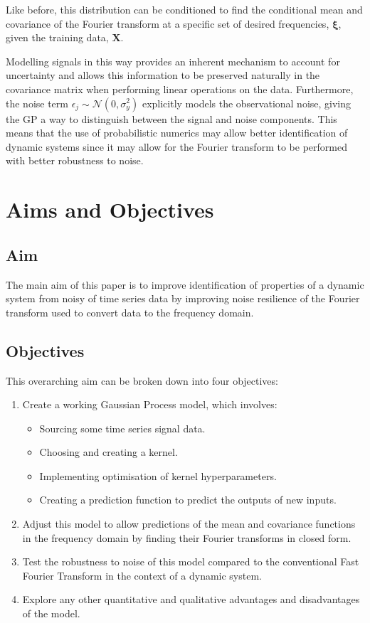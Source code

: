 \documentclass[12pt]{article}
\begin{document}
    Like before, this distribution can be conditioned to find the conditional mean and covariance of the Fourier transform at a specific set of desired frequencies, $\mathbf{\xi}$, given the training data, $\mathbf{X}$.

    Modelling signals in this way provides an inherent mechanism to account for uncertainty and allows this information to be preserved naturally in the covariance matrix when performing linear operations on the data.
    Furthermore, the noise term  $\epsilon_j \sim \mathcal{N}(0, \sigma^2_y)$ explicitly models the observational noise, giving the GP a way to distinguish between the signal and noise components.
    This means that the use of probabilistic numerics may allow better identification of dynamic systems since it may allow for the Fourier transform to be performed with better robustness to noise.

    \section{Aims and Objectives}
    \subsection{Aim}
    The main aim of this paper is to improve identification of properties of a dynamic system from noisy of time series data by improving noise resilience of the Fourier transform used to convert data to the frequency domain.

    \subsection{Objectives}
    This overarching aim can be broken down into four objectives:
        \begin{enumerate}
            \item Create a working Gaussian Process model, which involves:
                \begin{itemize}
                    \item Sourcing some time series signal data.
                    \item Choosing and creating a kernel.
                    \item Implementing optimisation of kernel hyperparameters. \label{item:nll}
                    \item Creating a prediction function to predict the outputs of new inputs. \label{item:predict}
                \end{itemize}
            \item Adjust this model to allow predictions of the mean and covariance functions in the frequency domain by finding their Fourier transforms in closed form. \label{item:FT}
            \item Test the robustness to noise of this model compared to the conventional Fast Fourier Transform in the context of a dynamic system. \label{noise-resilience}
            \item Explore any other quantitative and qualitative advantages and disadvantages of the model.
        \end{enumerate}
\end{document}
